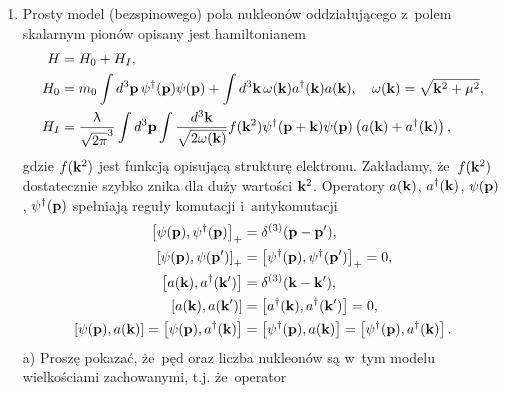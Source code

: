 \documentclass[a4paper,11pt]{article}
\begin{document}
\begin{enumerate}
\item Prosty model (bezspinowego) pola nukleonów oddziałującego
  z~polem skalarnym pionów opisany jest hamiltonianem
  \begin{align}
    H &= H_{ 0 } + H_{ I }, \\
    H_{ 0 }
      &=
        m_{ 0 } \int d^{ 3 }\mathbf{p} \, \psi^{ \dagger }( \mathbf{p} )
        \psi( \mathbf{p} )
        + \int d^{ 3 } \mathbf{k} \, \omega( \mathbf{k} ) a^{ \dagger }( \mathbf{k} )
        a( \mathbf{k} ),
        \quad
        \omega( \mathbf{k} ) = \sqrt{ \mathbf{k}^{ 2 } + \mu^{ 2 } }, \\
    H_{ I }
      &=
        \frac{ \uplambda }{ \sqrt{ 2\pi }^{ 3 } }
        \int d^{ 3 } \mathbf{p}
        \int \frac{ d^{ 3 } \mathbf{k} }{ \sqrt{ 2\omega( \mathbf{k} ) } }
        f( \mathbf{k}^{ 2 } ) \psi^{ \dagger }( \mathbf{p} + \mathbf{k} )
        \psi( \mathbf{p} )
        \left( a( \mathbf{k} ) + a^{ \dagger }( \mathbf{k} ) \right),
  \end{align}
  gdzie $f( \mathbf{k}^{ 2 } )$ jest funkcją opisującą strukturę
  elektronu. Zakładamy, że~$f( \mathbf{k}^{ 2 } )$ dostatecznie szybko
  znika dla duży wartości $\mathbf{k}^{ 2 }$. Operatory
  $a( \mathbf{k} )$, $a^{ \dagger }( \mathbf{k} )$, $\psi( \mathbf{p} )$,
  $\psi^{ \dagger }( \mathbf{p} )$ spełniają reguły komutacji i~antykomutacji
  \begin{align}
    \left[ \psi( \mathbf{p} ), \psi^{ \dagger }( \mathbf{p} ) \right]_{ + }
    &= \delta^{ ( 3 ) }( \mathbf{p} - \mathbf{p}' ), \\
    \left[ \psi( \mathbf{p} ), \psi( \mathbf{p}' ) \right]_{ + }
    &=
      \left[ \psi^{ \dagger }( \mathbf{p} ), \psi^{ \dagger }( \mathbf{p}' ) \right]_{ + }
      = 0, \\
    \left[ a( \mathbf{k} ), a^{ \dagger }( \mathbf{k}' ) \right]
    &= \delta^{ ( 3 ) }( \mathbf{k} - \mathbf{k}' ), \\
    \left[ a( \mathbf{k}), a( \mathbf{k}' ) \right]
    &=
      \left[ a^{ \dagger }( \mathbf{k} ), a^{ \dagger }( \mathbf{k}' ) \right] = 0, \\
    \left[ \psi( \mathbf{p} ), a( \mathbf{k} ) \right]
    = \left[ \psi( \mathbf{p} ), a^{ \dagger }( \mathbf{k} ) \right]
    &=
      \left[ \psi^{ \dagger }( \mathbf{p} ), a( \mathbf{k} ) \right]
      = \left[ \psi^{ \dagger }( \mathbf{p} ), a^{ \dagger }( \mathbf{k} ) \right].
  \end{align}
  a) Proszę pokazać, że~pęd oraz liczba nukleonów są w~tym modelu
  wielkościami zachowanymi, t.j. że~operator
  \begin{equation}

\end{equation}
\end{enumerate}
\end{document}
